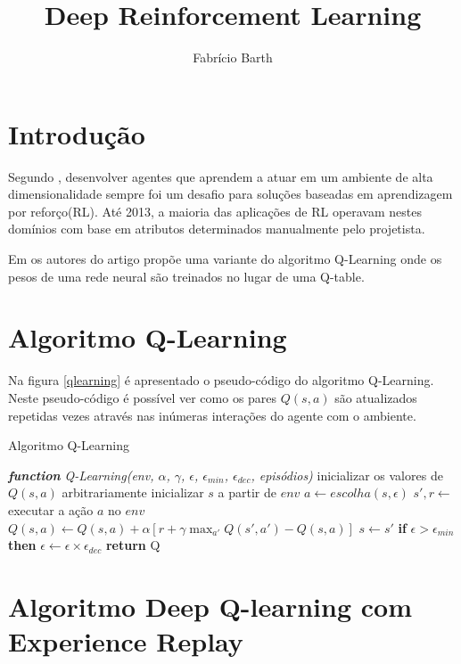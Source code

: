 \documentclass[12pt,a4paper]{article}
\title{Deep Reinforcement Learning}
\author{Fabrício Barth}
\begin{document}
	
\maketitle
	
\section{Introdução}
	
Segundo \cite{mni2013}, desenvolver agentes que aprendem a atuar em um ambiente de alta dimensionalidade sempre foi um desafio para soluções baseadas em aprendizagem por reforço(RL). Até 2013, a maioria das aplicações de RL operavam nestes domínios com base em atributos determinados manualmente pelo projetista.
	
Em \cite{mni2013} os autores do artigo propõe uma variante do algoritmo Q-Learning \cite{wat1992} onde os pesos de uma rede neural são treinados no lugar de uma Q-table. 
	
\section{Algoritmo Q-Learning}
	
Na figura \ref{qlearning} é apresentado o pseudo-código do algoritmo Q-Learning. Neste pseudo-código é possível ver como os pares $Q(s,a)$ são atualizados repetidas vezes através nas inúmeras interações do agente com o ambiente. 
	
\begin{algorithm}
\caption{Algoritmo Q-Learning}\label{qlearning}
\begin{algorithmic} 
\State \emph{\textbf{function} Q-Learning(env, $\alpha$, $\gamma$, $\epsilon$, $\epsilon_{min}$, $\epsilon_{dec}$, episódios)}
\State inicializar os valores de $Q(s, a)$ arbitrariamente
\State inicializar $s$ a partir de $env$
\Repeat
\State $a \leftarrow escolha(s, \epsilon)$
\State $s', r \leftarrow$ executar a ação $a$ no $env$
\State $Q(s,a) \leftarrow Q(s,a) + \alpha [r +\gamma \max_{a'}{Q(s', a')} - Q(s,a)]$
\State $s  \leftarrow s'$
\State \textbf{if} $\epsilon > \epsilon_{min}$ \textbf{then} $\epsilon \leftarrow \epsilon \times \epsilon_{dec}$
\EndFor
\State \textbf{return} Q
\end{algorithmic}   
\end{algorithm}

\section{Algoritmo Deep Q-learning com Experience Replay}
\end{document}
